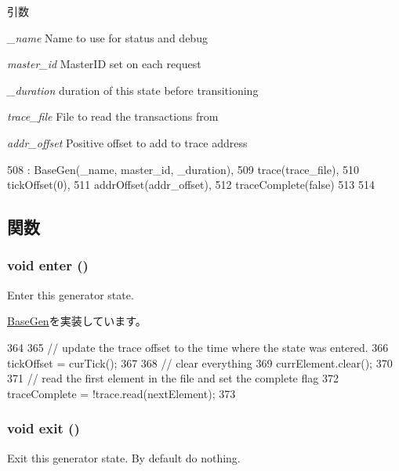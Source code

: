 \begin{DoxyParams}{引数}
\item[{\em \_\-name}]Name to use for status and debug \item[{\em master\_\-id}]MasterID set on each request \item[{\em \_\-duration}]duration of this state before transitioning \item[{\em trace\_\-file}]File to read the transactions from \item[{\em addr\_\-offset}]Positive offset to add to trace address \end{DoxyParams}



\begin{DoxyCode}
508         : BaseGen(_name, master_id, _duration),
509           trace(trace_file),
510           tickOffset(0),
511           addrOffset(addr_offset),
512           traceComplete(false)
513     {
514     }
\end{DoxyCode}


\subsection{関数}
\hypertarget{classTraceGen_a2759dad6560aaf485b16356d7142d69d}{
\subsubsection[{enter}]{\setlength{\rightskip}{0pt plus 5cm}void enter ()}}
\label{classTraceGen_a2759dad6560aaf485b16356d7142d69d}
Enter this generator state. 

\hyperlink{classBaseGen_ac51895063c53dfbc0f47a01940a3aa05}{BaseGen}を実装しています。


\begin{DoxyCode}
364 {
365     // update the trace offset to the time where the state was entered.
366     tickOffset = curTick();
367 
368     // clear everything
369     currElement.clear();
370 
371     // read the first element in the file and set the complete flag
372     traceComplete = !trace.read(nextElement);
373 }
\end{DoxyCode}
\hypertarget{classTraceGen_a358d2e2397ca11ccd17553e3c40e7901}{
\subsubsection[{exit}]{\setlength{\rightskip}{0pt plus 5cm}void exit ()}}
\label{classTraceGen_a358d2e2397ca11ccd17553e3c40e7901}
Exit this generator state. By default do nothing. 

